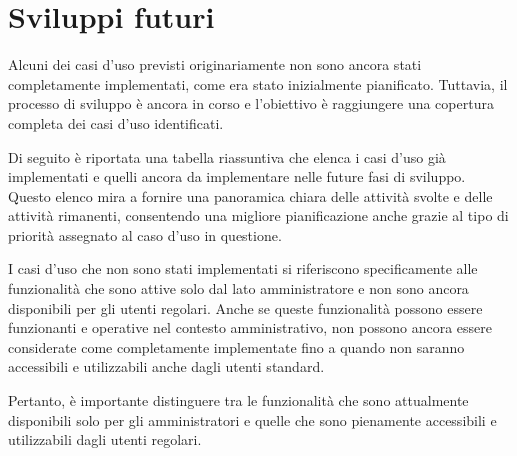 \section{Sviluppi futuri}
Alcuni dei casi d'uso previsti originariamente 
non sono ancora stati completamente implementati, come era stato 
inizialmente pianificato. Tuttavia, il processo di sviluppo 
è ancora in corso e l'obiettivo è raggiungere una copertura 
completa dei casi d'uso identificati.

Di seguito è riportata una tabella riassuntiva che elenca 
i casi d'uso già implementati e quelli ancora da implementare 
nelle future fasi di sviluppo. Questo elenco mira a fornire 
una panoramica chiara delle attività svolte e delle attività 
rimanenti, consentendo una migliore pianificazione anche grazie al tipo
di priorità assegnato al caso d'uso in questione. 

I casi d'uso che non sono stati implementati si riferiscono 
specificamente alle funzionalità che sono attive solo dal lato 
amministratore e non sono ancora disponibili per gli utenti regolari. 
Anche se queste funzionalità possono essere funzionanti e operative nel 
contesto amministrativo, non possono ancora essere considerate come 
completamente implementate fino a quando non saranno accessibili e utilizzabili 
anche dagli utenti standard. 

Pertanto, è importante distinguere tra le funzionalità 
che sono attualmente disponibili solo per gli amministratori e quelle che sono 
pienamente accessibili e utilizzabili dagli utenti regolari.

\newpage
